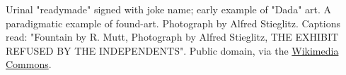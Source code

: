 Urinal "readymade" signed with joke name; early example of "Dada" art. A paradigmatic example of found-art. Photograph by Alfred Stieglitz. Captions read: "Fountain by R. Mutt, Photograph by Alfred Stieglitz, THE EXHIBIT REFUSED BY THE INDEPENDENTS".  Public domain, via the \href{https://commons.wikimedia.org/w/index.php?title=File:Duchamp_Fountaine.jpg&oldid=133561865}{Wikimedia Commons}.